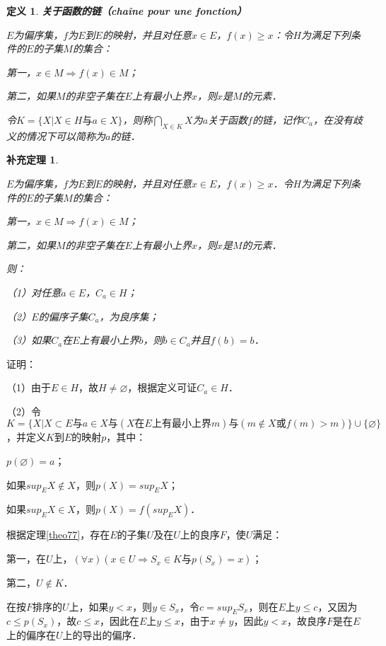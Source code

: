 \documentclass[12pt, a4paper, oneside]{book}
\newtheorem{cor}{补充定理}
\newtheorem{de}{定义}
\begin{document}
			\begin{de}
				\textbf{关于函数的链（chaîne pour une fonction）}
				\par
				$E$为偏序集，$f$为$E$到$E$的映射，并且对任意$x\in E$，$f(x)\geq x$：令$H$为满足下列条件的$E$的子集$M$的集合：
				\par
				第一，$x\in M\Rightarrow f(x)\in M$；
				\par
				第二，如果$M$的非空子集在$E$上有最小上界$x$，则$x$是$M$的元素．
				\par
				令$K=\{X|X\in H\text{与}a\in X\}$，则称$\bigcap\limits_{X\in K}X$为$a$关于函数$f$的链，记作$C_a$，在没有歧义的情况下可以简称为$a$的链．
			\end{de}
			
			\begin{cor}\label{cor232}
				\hfill\par
				$E$为偏序集，$f$为$E$到$E$的映射，并且对任意$x\in E$，$f(x)\geq x$．令$H$为满足下列条件的$E$的子集$M$的集合：
				\par
				第一，$x\in M \Rightarrow f(x)\in M$；
				\par
				第二，如果$M$的非空子集在$E$上有最小上界$x$，则$x$是$M$的元素．
				\par
				则：
				\par
				（1）对任意$a\in E$，$C_a\in H$；
				\par
				（2）$E$的偏序子集$C_a$，为良序集；
				\par
				（3）如果$C_a$在$E$上有最小上界$b$，则$b\in C_a$并且$f(b)=b$．
			\end{cor}
			证明：
			\par
			（1）由于$E\in H$，故$H\neq \varnothing$，根据定义可证$C_a\in H$．
			\par
			（2）令$K=\{X|X\subset E\text{与}a\in X\text{与}(X\text{在}E\text{上有最小上界}m)\text{与}(m\notin X\text{或}f(m)>m)\}\cup\{\varnothing\}$，并定义$K$到$E$的映射$p$，其中：
			\par
			$p(\varnothing)=a$；
			\par
			如果$sup_EX\notin X$，则$p(X)= sup_EX$；
			\par
			如果$sup_EX\in X$，则$p(X)=f(sup_EX)$．
			\par
			根据定理\ref{theo77}，存在$E$的子集$U$及在$U$上的良序$F$，使$U$满足：
			\par
			第一，在$U$上，$(\forall x)(x\in U\Rightarrow S_x\in K\text{与}p(S_x)=x)$；
			\par
			第二，$U\notin K$．
			\par
			在按$F$排序的$U$上，如果$y<x$，则$y\in S_x$，令$c=sup_ES_x$，则在$E$上$y\leq c$，又因为$c\leq p(S_x)$，故$c\leq x$，因此在$E$上$y\leq x$，由于$x\neq y$，因此$y<x$，故良序$F$是在$E$上的偏序在$U$上的导出的偏序．
\end{document}
